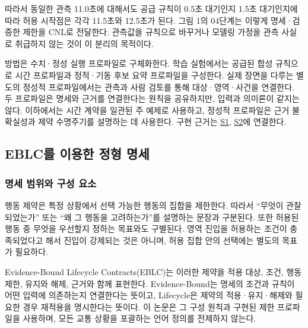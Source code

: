 \documentclass[10pt,a4paper,twocolumn]{article}\usepackage[margin=18mm]{geometry}\usepackage{fontspec,kotex}
\begin{document}
따라서 동일한 관측 11.0초에 대해서도 공급 규칙이 0.5초 대기인지 1.5초 대기인지에 따라 허용 시작점은 각각 11.5초와 12.5초가 된다. 그림 1의 04단계는 이렇게 명세·검증한 제한을 CNL로 전달한다. 관측값을 규칙으로 바꾸거나 모델링 가정을 관측 사실로 취급하지 않는 것이 이 분리의 목적이다.\par

방법은 수치·정성 실행 프로파일로 구체화한다. 학습 실험에서는 공급된 합성 규칙으로 시간 프로파일과 정적·기동 후보 요약 프로파일을 구성한다. 실제 장면을 다루는 별도의 정성적 프로파일에서는 관측과 사람 검토를 통해 대상·영역·사건을 연결한다. 두 프로파일은 명세와 근거를 연결한다는 원칙을 공유하지만, 입력과 의미론이 같지는 않다. 이하에서는 시간 계약을 일관된 주 예제로 사용하고, 정성적 프로파일은 근거 불확실성과 제약 수명주기를 설명하는 데 사용한다. 구현 근거는 \href{\detokenize{/home/jinhyun/prj_ws/prj_jin/guardsynth-cc/projects/04-guardsynth-coc/experiments/paper1_cnl_learning/temporal_preservation.py}}{S1}, \href{\detokenize{/home/jinhyun/prj_ws/prj_jin/guardsynth-cc/platforms/eblc-bcv/src/guard_synth_eblc/action_contract.py}}{S2}에 연결한다.\par

\subsection{EBLC를 이용한 정형 명세}

\subsubsection{명세 범위와 구성 요소}

행동 제약은 특정 상황에서 선택 가능한 행동의 집합을 제한한다. 따라서 “무엇이 관찰되었는가” 또는 “왜 그 행동을 고려하는가”를 설명하는 문장과 구분된다. 또한 허용된 행동 중 무엇을 우선할지 정하는 목표와도 구별된다. 영역 진입을 허용하는 조건이 충족되었다고 해서 진입이 강제되는 것은 아니며, 허용 집합 안의 선택에는 별도의 목표가 필요하다.\par

Evidence-Bound Lifecycle Contracts(EBLC)는 이러한 제약을 적용 대상, 조건, 행동 제한, 유지와 해제, 근거와 함께 표현한다. Evidence-Bound는 명세의 조건과 규칙이 어떤 입력에 의존하는지 연결한다는 뜻이고, Lifecycle은 제약의 적용·유지·해제와 필요한 경우 재적용을 명시한다는 뜻이다. 이 논문은 그 구성 원칙과 구현된 제한 프로파일을 사용하며, 모든 교통 상황을 포괄하는 언어 정의를 전제하지 않는다.\par
\end{document}
